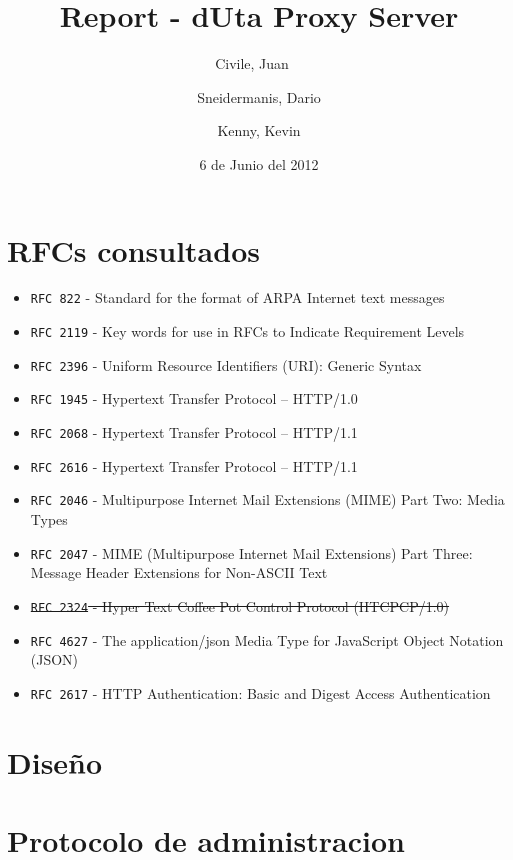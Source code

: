 \documentclass[11pt,a4paper,titlepage]{article}
\title{Report - dUta Proxy Server}
\author{Civile, Juan\ \  \and Sneidermanis, Dario \and Kenny, Kevin}
\date{6 de Junio del 2012}
\begin{document}
\newcommand{\awesome}[1]{\texttt{\large #1}}
\newcommand{\ua}{\textit{User Agent} }
\newcommand{\os}{\textit{Origin Server} }
\newcommand{\duta}{\awesome{dUta} }

\maketitle
\tableofcontents
\clearpage

\section{RFCs consultados}

\begin{itemize}

    \item \awesome{RFC 822}  - Standard for the format of ARPA Internet text messages
    \item \awesome{RFC 2119} - Key words for use in RFCs to Indicate Requirement Levels
    \item \awesome{RFC 2396} - Uniform Resource Identifiers (URI): Generic Syntax
    \item \awesome{RFC 1945} - Hypertext Transfer Protocol -- HTTP/1.0
    \item \awesome{RFC 2068} - Hypertext Transfer Protocol -- HTTP/1.1
    \item \awesome{RFC 2616} - Hypertext Transfer Protocol -- HTTP/1.1
    \item \awesome{RFC 2046} - Multipurpose Internet Mail Extensions (MIME) Part Two: Media Types
    \item \awesome{RFC 2047} - MIME (Multipurpose Internet Mail Extensions) Part Three: Message Header Extensions for Non-ASCII Text
    \item \sout{\awesome{RFC 2324} - Hyper Text Coffee Pot Control Protocol (HTCPCP/1.0)}
    \item \awesome{RFC 4627} - The application/json Media Type for JavaScript Object Notation (JSON)
    \item \awesome{RFC 2617} - HTTP Authentication: Basic and Digest Access Authentication
\end{itemize}


\section{Diseño}

\section{Protocolo de administracion}
\end{document}
